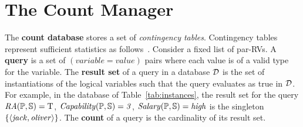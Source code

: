 
\section{The Count Manager} 




The \textbf{count database} \CDB stores a set of  {\em contingency tables}. Contingency tables represent sufficient statistics as follows~\cite{Moore1998}. 
Consider a fixed list of par-RVs.
A \textbf{query} is a set of $(variable = value)$ pairs where each value is of a valid type for the variable. 
The \textbf{result set} of a query in a database $\D$ is the set of instantiations of the logical variables such that the query evaluates as true in $\D$.
For example, in the database of  Table~\ref{tab:instances}, 
the result set for the query 
$\it{RA}(\P,\S) = \true$, $\it{Capability}(\P,\S) = 3$, $\it{Salary}(\P,\S) = \it{high} $ is
the singleton $\{\langle \it{jack}, \it{oliver}\rangle\}$. 
The \textbf{count} of a query is the cardinality of its result set. 

